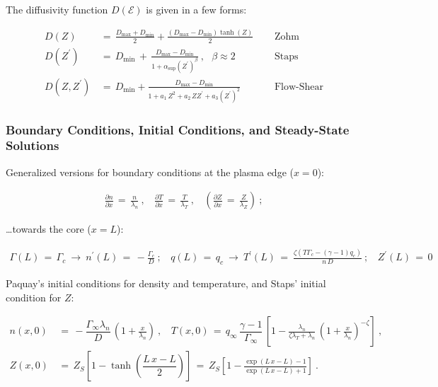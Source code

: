 \documentclass[a4paper,8pt]{article}
\begin{document}
\normalsize

The diffusivity function \(D(\mathcal{E})\) is given in a few forms:
\small

\begin{align}
    D(Z) \,&=\, \frac{D_\text{max} + D_\text{min}}{2} +
        \frac{(D_\text{max} - D_\text{min})\tanh(Z)}{2} ~~~~~~ &\text{Zohm} \\
    D(Z^\prime) \,&=\, D_\text{min} \,+\, \frac{D_\text{max} - D_\text{min}}
        {1 + \alpha_\text{sup}(Z^\prime)^\beta}~,~~~ \beta \approx 2 ~~~~~~
        &\text{Staps} \\
    D(Z, Z^\prime) \,&=\, D_\text{min} + \frac{D_\text{max} - D_\text{min}}
        {1 + a_1\,Z^2 + a_2\,Z Z^\prime + a_3\left(Z^\prime\right)^2} ~~~~~~
        &\text{Flow-Shear}
\end{align}

\normalsize

\subsubsection{Boundary Conditions, Initial Conditions, and Steady-State
Solutions}\label{boundary-conditions-initial-conditions-and-steady-state-solutions}

Generalized versions for boundary conditions at the plasma edge
(\(x=0\)): \small

\begin{align}
    \frac{\partial n}{\partial x} \,=\, \frac{n}{\lambda_n}~,
        ~~~~\frac{\partial T}{\partial x} \,=\, \frac{T}{\lambda_T}~,
        ~~~~\left(\frac{\partial Z}{\partial x} \,=\, \frac{Z}{\lambda_Z}\right)~;
\end{align}

\normalsize

\ldots{}towards the core (\(x=L\)): \small

\begin{align}
    \Gamma(L) \,=\, \Gamma_c ~\longrightarrow~ n^\prime(L) \,=\,
        -\frac{\Gamma_c}{D}~; ~~~~
        q(L) \,=\, q_c ~\longrightarrow~ T^\prime(L) \,=\
        \frac{\zeta\left(T \Gamma_c - (\gamma - 1) q_c\right)}{n\,D}~; ~~~~
        Z^\prime(L) \,=\, 0
\end{align}

\normalsize

Paquay's initial conditions for density and temperature, and Staps'
initial condition for \(Z\): \small

\begin{align}
    n(x,0) \,&=\, -\dfrac{\Gamma_\infty \lambda_n}{D} \,
        \left(1 + \frac{x}{\lambda_n}\right)~, ~~~~ T(x,0) \,=\, q_\infty \,
        \dfrac{\gamma - 1}{\Gamma_\infty} \, \left[1
        - \frac{\lambda_n}{\zeta \lambda_T + \lambda_n} \, \left(1
        + \frac{x}{\lambda_n}\right)^{-\zeta}\right]~, \\
    Z(x,0) \,&=\, Z_S\left[1 - \tanh\left(\dfrac{L\,x - L}{2}\right)\right]
        \,=\, Z_S\left[1 - \frac{\exp(L\,x - L) - 1}{\exp(L\,x - L)
        + 1}\right]~.
\end{align}
\end{document}
